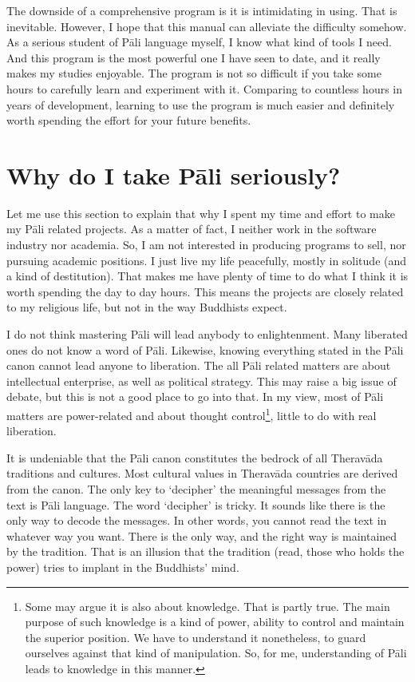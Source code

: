 The downside of a comprehensive program is it is intimidating in using. That is inevitable. However, I hope that this manual can alleviate the difficulty somehow. As a serious student of Pāli language myself, I know what kind of tools I need. And this program is the most powerful one I have seen to date, and it really makes my studies enjoyable. The program is not so difficult if you take some hours to carefully learn and experiment with it. Comparing to countless hours in years of development, learning to use the program is much easier and definitely worth spending the effort for your future benefits.

\section{Why do I take Pāli seriously?}

Let me use this section to explain that why I spent my time and effort to make my Pāli related projects. As a matter of fact, I neither work in the software industry nor academia. So, I am not interested in producing programs to sell, nor pursuing academic positions. I just live my life peacefully, mostly in solitude (and a kind of destitution). That makes me have plenty of time to do what I think it is worth spending the day to day hours. This means the projects are closely related to my religious life, but not in the way Buddhists expect.

I do not think mastering Pāli will lead anybody to enlightenment. Many liberated ones do not know a word of Pāli. Likewise, knowing everything stated in the Pāli canon cannot lead anyone to liberation. The all Pāli related matters are about intellectual enterprise, as well as political strategy. This may raise a big issue of debate, but this is not a good place to go into that. In my view, most of Pāli matters are power-related and about thought control\footnote{Some may argue it is also about knowledge. That is partly true. The main purpose of such knowledge is a kind of power, ability to control and maintain the superior position. We have to understand it nonetheless, to guard ourselves against that kind of manipulation. So, for me, understanding of Pāli leads to knowledge in this manner.}, little to do with real liberation.

It is undeniable that the Pāli canon constitutes the bedrock of all Theravāda traditions and cultures. Most cultural values in Theravāda countries are derived from the canon. The only key to `decipher' the meaningful messages from the text is Pāli language. The word `decipher' is tricky. It sounds like there is the only way to decode the messages. In other words, you cannot read the text in whatever way you want. There is the only way, and the right way is maintained by the tradition. That is an illusion that the tradition (read, those who holds the power) tries to implant in the Buddhists' mind.

